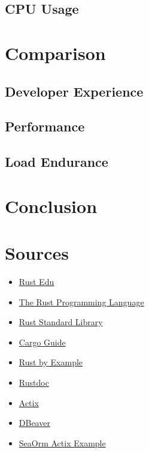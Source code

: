 \documentclass[a4paper,12pt]{article}
\begin{document}
	\subsection*{CPU Usage}

	\section{Comparison}
	\label{sec:comparison}


	\subsection{Developer Experience}
	\label{subsec:developer_experience}
	
	\subsection{Performance}
	\label{subsec:performance}

	\subsection{Load Endurance}
	\label{subsec:load_endurance}

	\section{Conclusion}
	\label{subsec:conclusion}
	
	\newpage
	\section{Sources}
	\label{sec:Sources}
	\begin{itemize}
		\item \href{https://rust-edu.org/resources/}{Rust Edu}
		\item \href{https://doc.rust-lang.org/book/}{The Rust Programming Language}
		\item \href{https://doc.rust-lang.org/std/}{Rust Standard Library}
		\item \href{https://doc.rust-lang.org/cargo/}{Cargo Guide}
		\item \href{https://doc.rust-lang.org/rust-by-example/}{Rust by Example}
		\item \href{https://doc.rust-lang.org/rustdoc/}{Rustdoc}
		\item \href{https://actix.rs/}{Actix}
		\item \href{https://dbeaver.io/}{DBeaver}
		\item \href{https://github.com/SeaQL/SeaOrm/tree/master/examples/actix_example}{SeaOrm Actix Example}
	\end{itemize}
	\printbibliography[title={Whole bibliography}]
\end{document}
